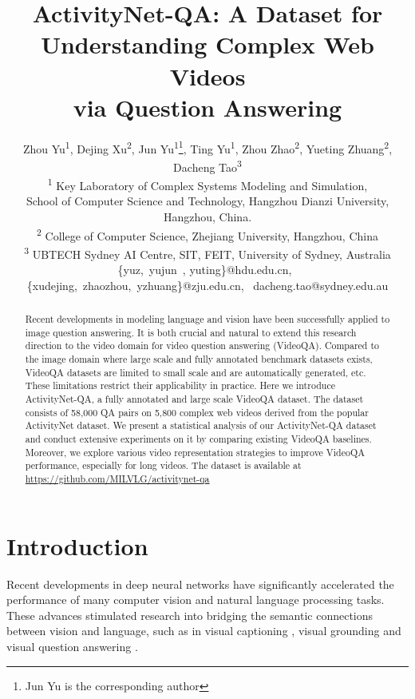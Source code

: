 \documentclass[letterpaper]{article} \usepackage{aaai19}  \usepackage{times}  \usepackage{helvet}  \usepackage{courier}  \usepackage{url}  \usepackage{graphicx}  \usepackage{amsfonts}
\begin{document}
\title{ActivityNet-QA: A Dataset for Understanding Complex Web Videos\\ via Question Answering}
\author{
Zhou Yu\textsuperscript{\rm 1},
Dejing Xu\textsuperscript{\rm 2},
Jun Yu\textsuperscript{\rm 1}\thanks{Jun Yu is the corresponding author},
Ting Yu\textsuperscript{\rm 1},
Zhou Zhao\textsuperscript{\rm 2},
Yueting Zhuang\textsuperscript{\rm 2},
Dacheng Tao\textsuperscript{\rm 3}
\\
\textsuperscript{\rm 1} Key Laboratory of Complex Systems Modeling and Simulation, \\
School of Computer Science and Technology, Hangzhou Dianzi University, Hangzhou, China.\\
\textsuperscript{\rm 2} College of Computer Science, Zhejiang University, Hangzhou, China\\
\textsuperscript{\rm 3} UBTECH Sydney AI Centre, SIT, FEIT, University of Sydney, Australia\\
\{yuz,~yujun~, yuting\}@hdu.edu.cn,~
\{xudejing,~zhaozhou,~yzhuang\}@zju.edu.cn,~
dacheng.tao@sydney.edu.au
}

\maketitle
\begin{abstract}
Recent developments in modeling language and vision have been successfully applied to image question answering. It is both crucial and natural to extend this research direction to the video domain for video question answering (VideoQA). Compared to the image domain where large scale and fully annotated benchmark datasets exists, VideoQA datasets are limited to small scale and are automatically generated, etc. These limitations restrict their applicability in practice. Here we introduce ActivityNet-QA, a fully annotated and large scale VideoQA dataset. The dataset consists of 58,000 QA pairs on 5,800 complex web videos derived from the popular ActivityNet dataset. We present a statistical analysis of our ActivityNet-QA dataset and conduct extensive experiments on it by comparing existing VideoQA baselines. Moreover, we explore various video representation strategies to improve VideoQA performance, especially for long videos. The dataset is available at \url{https://github.com/MILVLG/activitynet-qa}
\end{abstract}

\section{Introduction}
Recent developments in deep neural networks have significantly accelerated the performance of many computer vision and natural language processing tasks. These advances stimulated research into bridging the semantic connections between vision and language, such as in visual captioning \cite{donahue2015long,xu2015show}, visual grounding \cite{rohrbach2016grounding,chen2017query,yu2018rethinking} and visual question answering \cite{malinowski2015ask,fukui2016multimodal}.
\end{document}
